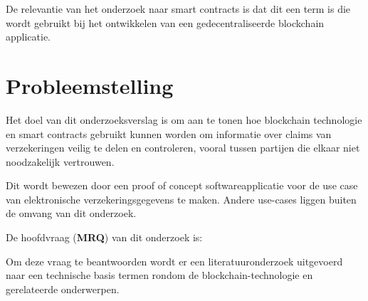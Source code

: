 De relevantie van het onderzoek naar smart contracts is dat dit een term is die wordt gebruikt bij het ontwikkelen van een gedecentraliseerde blockchain applicatie.

\newpage

\section{Probleemstelling}\label{chap:researchQuestions}
Het doel van dit onderzoeksverslag is om aan te tonen hoe blockchain technologie en smart contracts gebruikt kunnen worden om informatie over claims van verzekeringen veilig te delen en controleren, vooral tussen partijen die elkaar niet noodzakelijk vertrouwen.\par
Dit wordt bewezen door een proof of concept softwareapplicatie voor de use case van elektronische verzekeringsgegevens te maken. Andere use-cases liggen buiten de omvang van dit onderzoek.
\par	
De hoofdvraag (\textbf{MRQ}) van dit onderzoek is:
\begin{center}
	\textbf{\researchQuestionMain}
\end{center}
Om deze vraag te beantwoorden wordt er een literatuuronderzoek uitgevoerd naar een technische basis termen rondom de blockchain-technologie en gerelateerde onderwerpen.
\newpage